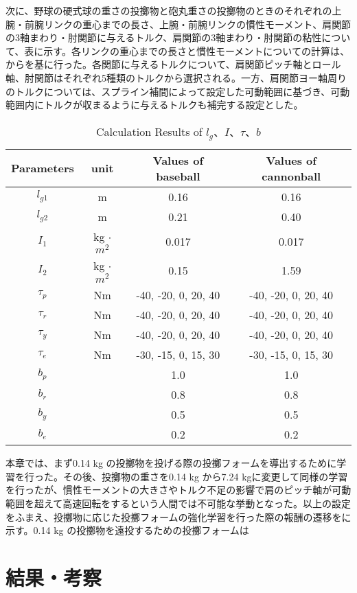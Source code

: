 次に、野球の硬式球の重さの投擲物と砲丸重さの投擲物のときのそれぞれの上腕・前腕リンクの重心までの長さ、上腕・前腕リンクの慣性モーメント、肩関節の3軸まわり・肘関節に与えるトルク、肩関節の3軸まわり・肘関節の粘性について、表に示す。各リンクの重心までの長さと慣性モーメントについての計算は、からを基に行った。各関節に与えるトルクについて、肩関節ピッチ軸とロール軸、肘関節はそれぞれ5種類のトルクから選択される。一方、肩関節ヨー軸周りのトルクについては、スプライン補間によって設定した可動範囲に基づき、可動範囲内にトルクが収まるように与えるトルクも補完する設定とした。

\begin{table}[tb]
  \begin{center}
    \caption{Calculation Results of $l_{g}$、$I$、$\tau$、$b$}

    \begin{tabular}{c|c|c|c}
      \hline
      Parameters & unit & Values of baseball & Values of cannonball \\
      \hline
      $l_{g1}$ & m & 0.16 & 0.16 \\
      $l_{g2}$ & m & 0.21 & 0.40 \\
      $I_{1}$ & kg $\cdot$ ${m}^2$ & 0.017 & 0.017 \\
      $I_{2}$ & kg $\cdot$ ${m}^2$ & 0.15 & 1.59 \\
      $\tau_{p}$ & Nm & -40, -20, 0, 20, 40 & -40, -20, 0, 20, 40 \\
      $\tau_{r}$ & Nm & -40, -20, 0, 20, 40 & -40, -20, 0, 20, 40 \\
      $\tau_{y}$ & Nm & -40, -20, 0, 20, 40 & -40, -20, 0, 20, 40 \\
      $\tau_{e}$ & Nm & -30, -15, 0, 15, 30 & -30, -15, 0, 15, 30 \\
      $b_{p}$ &  & 1.0 & 1.0\\
      $b_{r}$ &  & 0.8 & 0.8\\
      $b_{y}$ &  & 0.5 & 0.5\\
      $b_{e}$ &  & 0.2 & 0.2\\
      \hline
    \end{tabular}
  \end{center}
\end{table}

本章では、まず0.14 kg の投擲物を投げる際の投擲フォームを導出するために学習を行った。その後、投擲物の重さを0.14 kg から7.24 kgに変更して同様の学習を行ったが、慣性モーメントの大きさやトルク不足の影響で肩のピッチ軸が可動範囲を超えて高速回転をするという人間では不可能な挙動となった。以上の設定をふまえ、投擲物に応じた投擲フォームの強化学習を行った際の報酬の遷移をに示す。0.14 kg の投擲物を遠投するための投擲フォームは

\section{結果・考察}
